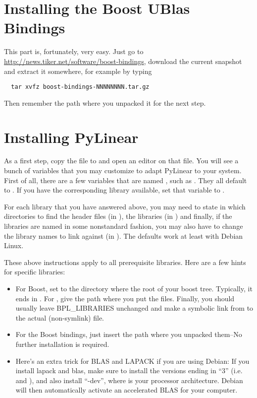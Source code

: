 \section{Installing the Boost UBlas Bindings}

\label{sec:install-bindings}
This part is, fortunately, very easy. Just go to \url{http://news.tiker.net/software/boost-bindings},
download the current snapshot and extract it somewhere, for example by typing
\begin{verbatim}
  tar xvfz boost-bindings-NNNNNNNN.tar.gz
\end{verbatim}
Then remember the path where you unpacked it for the next step.

\section{Installing PyLinear}

As a first step, copy the file  to
 and open an editor on that file. You will
see a bunch of variables that you may customize to adapt
PyLinear to your system. First of all, there are a few variables
that are named , such as . They
all default to . If you have the corresponding library
available, set that variable to .

For each library that you have answered  above, you may
need to state in which directories to find the header files (in
), the libraries (in )
and finally, if the libraries are named in some nonstandard fashion,
you may also have to change the library names to link against (in
). The defaults work at least with Debian Linux. 

These above instructions apply to all prerequisite libraries. Here are
a few hints for specific libraries:
\begin{itemize}
\item For Boost, set  to the directory where
  the root of your boost tree.  Typically, it ends in
  . For , give the path where you
  put the  files. Finally, you should
  usually leave BPL_LIBRARIES unchanged and make a symbolic link from
   to the actual (non-symlink) 
  file.
\item For the Boost bindings, just insert the path where you unpacked
  them--No further installation is required.
\item Here's an extra trick for BLAS and LAPACK if you are using
  Debian: If you install lapack and blas, make sure to install the
  versions ending in ``3'' (i.e.  and
  ), and also install ``-dev'',
  where  is your processor architecture. Debian will then
  automatically activate an accelerated BLAS for your computer.
\end{itemize}

